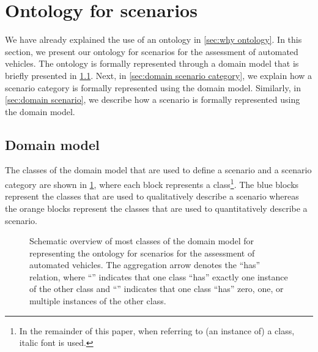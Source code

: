 \section{Ontology for scenarios}
\label{sec:ontology}

We have already explained the use of an ontology in \cref{sec:why ontology}. In this section, we present our ontology for scenarios for the assessment of automated vehicles. 
The ontology is formally represented through a domain model that is briefly presented in \cref{sec:domain model}. Next, in \cref{sec:domain scenario category}, we explain how a scenario category is formally represented using the domain model. Similarly, in \cref{sec:domain scenario}, we describe how a scenario is formally represented using the domain model. 



\subsection{Domain model}
\label{sec:domain model}

The classes of the domain model that are used to define a scenario and a scenario category are shown in \cref{fig:ontology classes}, where each block represents a class\footnote{In the remainder of this paper, when referring to (an instance of) a class, italic font is used.}.
The blue blocks represent the classes that are used to qualitatively describe a scenario whereas the orange blocks represent the classes that are used to quantitatively describe a scenario. 

\begin{figure}
	\centering
	
	\caption{Schematic overview of most classes of the domain model for representing the ontology for scenarios for the assessment of automated vehicles. The aggregation arrow denotes the ``has'' relation, where ``\hasone'' indicates that one class ``has'' exactly one instance of the other class and ``\hasn'' indicates that one class ``has'' zero, one, or multiple instances of the other class.}
	\label{fig:ontology classes}
\end{figure}


